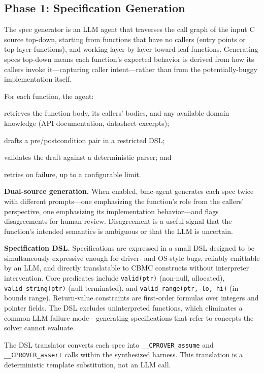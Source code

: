 \documentclass[11pt,a4paper]{article}
\newcommand{\tool}{bmc-agent\xspace}
\begin{document}
\subsection{Phase 1: Specification Generation}
\label{sec:specgen}

The spec generator is an LLM agent that traverses the call graph of the input
C source top-down, starting from functions that have no callers (entry points
or top-layer functions), and working layer by layer toward leaf functions.
Generating specs top-down means each function's expected behavior is derived
from how its callers invoke it---capturing caller intent---rather than from the
potentially-buggy implementation itself.

For each function, the agent:
\begin{enumerate*}[label=(\roman*)]
  \item retrieves the function body, its callers' bodies, and any available
  domain knowledge (API documentation, datasheet excerpts);
  \item drafts a pre/postcondition pair in a restricted DSL;
  \item validates the draft against a deterministic parser; and
  \item retries on failure, up to a configurable limit.
\end{enumerate*}

\smallskip\noindent\textbf{Dual-source generation.}
When enabled, \tool generates each spec twice with different prompts---one
emphasizing the function's role from the callers' perspective, one emphasizing
its implementation behavior---and flags disagreements for human review.
Disagreement is a useful signal that the function's intended semantics is
ambiguous or that the LLM is uncertain.

\smallskip\noindent\textbf{Specification DSL.}
Specifications are expressed in a small DSL designed to be simultaneously
expressive enough for driver- and OS-style bugs, reliably emittable by an LLM,
and directly translatable to CBMC constructs without interpreter intervention.
Core predicates include \lstinline{valid(ptr)} (non-null, allocated),
\lstinline{valid_string(ptr)} (null-terminated), and
\lstinline{valid_range(ptr, lo, hi)} (in-bounds range). Return-value
constraints are first-order formulas over integers and pointer fields. The DSL
excludes uninterpreted functions, which eliminates a common LLM failure
mode---generating specifications that refer to concepts the solver cannot
evaluate.

The DSL translator converts each spec into \lstinline{__CPROVER_assume} and
\lstinline{__CPROVER_assert} calls within the synthesized harness. This
translation is a deterministic template substitution, not an LLM call.
\end{document}
